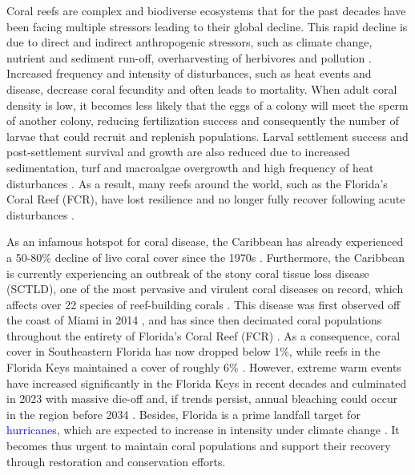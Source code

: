 \documentclass[preprint,12pt,authoryear]{elsarticle}
\newcommand{\modif}[1]{\textcolor{blue}{#1}}
\begin{document}
	Coral reefs are complex and biodiverse ecosystems that for the past decades have been facing multiple stressors leading to their global decline. This rapid decline is due to direct and indirect anthropogenic stressors, such as climate change, nutrient and sediment run-off, overharvesting of herbivores and pollution \citep{hughes2003climate, hughes2018spatial, hoegh2007coral, hoegh2017coral}. Increased frequency and intensity of disturbances, such as heat events and disease, decrease coral fecundity and often leads to mortality. When adult coral density is low, it becomes less likely that the eggs of a colony will meet the sperm of another colony, reducing fertilization success and consequently the number of larvae that could recruit and replenish populations. Larval settlement success and post-settlement survival and growth are also reduced due to increased sedimentation, turf and macroalgae overgrowth and high frequency of heat disturbances \modif{\citep{tuttle2022effects}}. As a result, many reefs around the world, such as the Florida’s Coral Reef (FCR), have lost resilience and no longer fully recover following acute disturbances \citep{jones2022frequent}.
	
	As an infamous hotspot for coral disease, the Caribbean has already experienced a 50-80\% decline of live coral cover since the 1970s \citep{gardner2003long,jackson2014status}. Furthermore, the Caribbean is currently experiencing an outbreak of the stony coral tissue loss disease (SCTLD), one of the most pervasive and virulent coral diseases on record, which affects over 22 species of reef-building corals \modif{\citep{walton2018impacts,hayes2022tissue}}. This disease was first observed off the coast of Miami in 2014 \citep{precht2016unprecedented}, and has since then decimated coral populations throughout the entirety of Florida's Coral Reef (FCR) \citep{williams2021fine,hayes2022tissue,frrp2021}. As a consequence, coral cover in Southeastern Florida has now dropped below 1\%, while reefs in the Florida Keys maintained a cover of roughly 6\% \citep{grove2022national}. However, extreme warm events have increased significantly in the Florida Keys in recent decades and culminated in 2023 with massive die-off \citep{neely2024too} and, if trends persist, annual bleaching could occur in the region before 2034 \citep{manzello2015rapid}. Besides, Florida is a prime landfall target for \modif{hurricanes}, which are expected to increase in intensity under climate change \citep{dobbelaere2024hurricanes}. It becomes thus urgent to maintain coral populations and support their recovery through restoration and conservation efforts.
	
\end{document}
